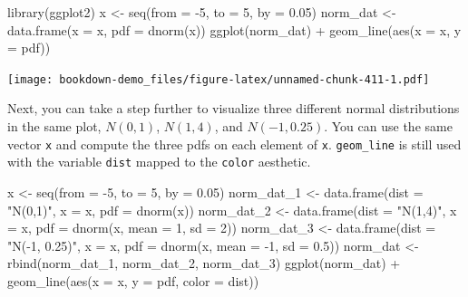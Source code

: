 \documentclass[
]{book}
\newenvironment{Shaded}{\begin{snugshade}}{\end{snugshade}}
\newcommand{\AttributeTok}[1]{\textcolor[rgb]{0.77,0.63,0.00}{#1}}
\newcommand{\DecValTok}[1]{\textcolor[rgb]{0.00,0.00,0.81}{#1}}
\newcommand{\FloatTok}[1]{\textcolor[rgb]{0.00,0.00,0.81}{#1}}
\newcommand{\FunctionTok}[1]{\textcolor[rgb]{0.00,0.00,0.00}{#1}}
\newcommand{\NormalTok}[1]{#1}
\newcommand{\OtherTok}[1]{\textcolor[rgb]{0.56,0.35,0.01}{#1}}
\newcommand{\SpecialCharTok}[1]{\textcolor[rgb]{0.00,0.00,0.00}{#1}}
\newcommand{\StringTok}[1]{\textcolor[rgb]{0.31,0.60,0.02}{#1}}
\begin{document}
\begin{Shaded}
\begin{Highlighting}[]
\FunctionTok{library}\NormalTok{(ggplot2)}
\NormalTok{x }\OtherTok{\textless{}{-}} \FunctionTok{seq}\NormalTok{(}\AttributeTok{from =} \SpecialCharTok{{-}}\DecValTok{5}\NormalTok{, }\AttributeTok{to =} \DecValTok{5}\NormalTok{, }\AttributeTok{by =} \FloatTok{0.05}\NormalTok{)}
\NormalTok{norm\_dat }\OtherTok{\textless{}{-}} \FunctionTok{data.frame}\NormalTok{(}\AttributeTok{x =}\NormalTok{ x, }\AttributeTok{pdf =} \FunctionTok{dnorm}\NormalTok{(x))}
\FunctionTok{ggplot}\NormalTok{(norm\_dat) }\SpecialCharTok{+} \FunctionTok{geom\_line}\NormalTok{(}\FunctionTok{aes}\NormalTok{(}\AttributeTok{x =}\NormalTok{ x, }\AttributeTok{y =}\NormalTok{ pdf))}
\end{Highlighting}
\end{Shaded}

\texttt{[image: bookdown-demo\_files/figure-latex/unnamed-chunk-411-1.pdf]}

Next, you can take a step further to visualize three different normal distributions in the same plot, \(N(0,1)\), \(N(1,4)\), and \(N(-1, 0.25)\). You can use the same vector \texttt{x} and compute the three pdfs on each element of \texttt{x}. \texttt{geom\_line} is still used with the variable \texttt{dist} mapped to the \texttt{color} aesthetic.

\begin{Shaded}
\begin{Highlighting}[]
\NormalTok{x }\OtherTok{\textless{}{-}} \FunctionTok{seq}\NormalTok{(}\AttributeTok{from =} \SpecialCharTok{{-}}\DecValTok{5}\NormalTok{, }\AttributeTok{to =} \DecValTok{5}\NormalTok{, }\AttributeTok{by =} \FloatTok{0.05}\NormalTok{)}
\NormalTok{norm\_dat\_1 }\OtherTok{\textless{}{-}} \FunctionTok{data.frame}\NormalTok{(}\AttributeTok{dist =} \StringTok{"N(0,1)"}\NormalTok{, }\AttributeTok{x =}\NormalTok{ x, }\AttributeTok{pdf =} \FunctionTok{dnorm}\NormalTok{(x))}
\NormalTok{norm\_dat\_2 }\OtherTok{\textless{}{-}} \FunctionTok{data.frame}\NormalTok{(}\AttributeTok{dist =} \StringTok{"N(1,4)"}\NormalTok{, }\AttributeTok{x =}\NormalTok{ x, }\AttributeTok{pdf =} \FunctionTok{dnorm}\NormalTok{(x, }\AttributeTok{mean =} \DecValTok{1}\NormalTok{, }\AttributeTok{sd =} \DecValTok{2}\NormalTok{))}
\NormalTok{norm\_dat\_3 }\OtherTok{\textless{}{-}} \FunctionTok{data.frame}\NormalTok{(}\AttributeTok{dist =} \StringTok{"N({-}1, 0.25)"}\NormalTok{, }\AttributeTok{x =}\NormalTok{ x, }\AttributeTok{pdf =} \FunctionTok{dnorm}\NormalTok{(x, }\AttributeTok{mean =} \SpecialCharTok{{-}}\DecValTok{1}\NormalTok{, }\AttributeTok{sd =} \FloatTok{0.5}\NormalTok{))}
\NormalTok{norm\_dat }\OtherTok{\textless{}{-}} \FunctionTok{rbind}\NormalTok{(norm\_dat\_1, norm\_dat\_2, norm\_dat\_3)}
\FunctionTok{ggplot}\NormalTok{(norm\_dat) }\SpecialCharTok{+} \FunctionTok{geom\_line}\NormalTok{(}\FunctionTok{aes}\NormalTok{(}\AttributeTok{x =}\NormalTok{ x, }\AttributeTok{y =}\NormalTok{ pdf, }\AttributeTok{color =}\NormalTok{ dist))}
\end{Highlighting}
\end{Shaded}
\end{document}
